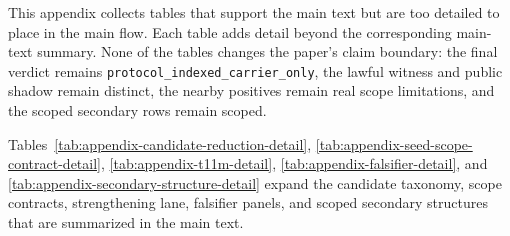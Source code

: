 \documentclass[11pt]{article}
\theoremstyle{definition}
\begin{document}
This appendix collects tables that support the main text but are too detailed to place in
the main flow. Each table adds detail beyond the corresponding main-text summary. None of
the tables changes the paper's claim boundary: the final verdict remains
\texttt{protocol\_indexed\_carrier\_only}, the lawful witness and public shadow remain
distinct, the nearby positives remain real scope limitations, and the scoped secondary
rows remain scoped.

Tables~\ref{tab:appendix-candidate-reduction-detail},
\ref{tab:appendix-seed-scope-contract-detail},
\ref{tab:appendix-t11m-detail}, \ref{tab:appendix-falsifier-detail}, and
\ref{tab:appendix-secondary-structure-detail} expand the candidate taxonomy, scope
contracts, strengthening lane, falsifier panels, and scoped secondary structures that are
summarized in the main text.
\end{document}

